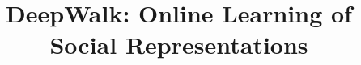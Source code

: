 \documentclass{sig-alternate}
\begin{document}
%

\title{DeepWalk: 
Online Learning of Social Representations
}

%
%
%
%
%
\end{document}
